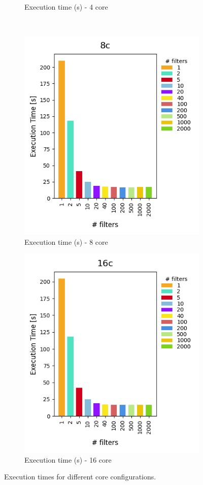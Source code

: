 \documentclass[12pt,a4paper]{article}
\begin{document}
\begin{figure}[H]
\begin{subfigure}[b]{0.45\textwidth}
    \caption{Execution time (s) - 4 core}
  \end{subfigure}
  \\
  \begin{subfigure}[b]{0.45\textwidth}
    \centering
    \includegraphics[scale=0.6]{images/4-Experiments/E2/fixedcores/8c/execTime.png}
    \caption{Execution time (s) - 8 core}
  \end{subfigure}
  \hfill
  \begin{subfigure}[b]{0.45\textwidth}
    \centering
    \includegraphics[scale=0.6]{images/4-Experiments/E2/fixedcores/16c/execTime.png}
    \caption{Execution time (s) - 16 core}
  \end{subfigure}
  \caption{Execution times for different core configurations.}
  \label{fig:execution-times}
\end{figure}
\end{document}
